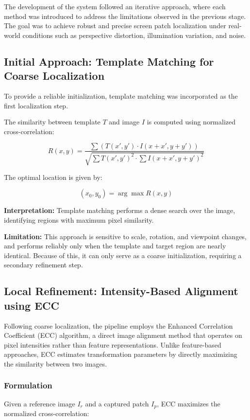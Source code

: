 \documentclass[conference]{IEEEtran}
\begin{document}
The development of the system followed an iterative approach, where each method was introduced to address the limitations observed in the previous stage. The goal was to achieve robust and precise screen patch localization under real-world conditions such as perspective distortion, illumination variation, and noise.

\subsection{Initial Approach: Template Matching for Coarse Localization}

To provide a reliable initialization, template matching was incorporated as the first localization step.

The similarity between template $T$ and image $I$ is computed using normalized cross-correlation:

\[
R(x,y) = \frac{\sum (T(x',y') \cdot I(x+x', y+y'))}
{\sqrt{\sum T(x',y')^2 \cdot \sum I(x+x', y+y')^2}}
\]

The optimal location is given by:

\[
(x_0, y_0) = \arg\max R(x,y)
\]

\textbf{Interpretation:}  
Template matching performs a dense search over the image, identifying regions with maximum pixel similarity.

\textbf{Limitation:}  
This approach is sensitive to scale, rotation, and viewpoint changes, and performs reliably only when the template and target region are nearly identical. Because of this, it can only serve as a coarse initialization, requiring a secondary refinement step.

\subsection{Local Refinement: Intensity-Based Alignment using ECC}

Following coarse localization, the pipeline employs the Enhanced Correlation Coefficient (ECC) algorithm, a direct image alignment method that operates on pixel intensities rather than feature representations. Unlike feature-based approaches, ECC estimates transformation parameters by directly maximizing the similarity between two images.

\subsubsection{Formulation}

Given a reference image $I_r$ and a captured patch $I_p$, ECC maximizes the normalized cross-correlation:
\end{document}
